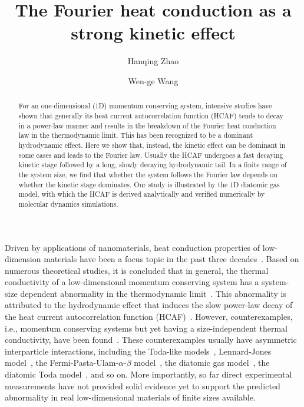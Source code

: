 \documentclass[twocolumn,secnumarabic,amssymb, nobibnotes, aps, pre,superscriptaddress]{revtex4}
\begin{document}


\title{The Fourier heat conduction as a strong kinetic effect}


\author{Hanqing Zhao}
\author{Wen-ge Wang}

\begin{abstract}
For an one-dimensional (1D) momentum conserving system, intensive studies have shown that generally its heat current autocorrelation function (HCAF) tends to decay in a power-law manner and results in the breakdown of the Fourier heat conduction law in the thermodynamic limit. This has been recognized to be a dominant hydrodynamic effect. Here we show that, instead, the kinetic effect can be dominant in some cases and leads to the Fourier law. Usually the HCAF undergoes a fast decaying kinetic stage followed by a long, slowly decaying hydrodynamic tail. In a finite range of the system size, we find that whether the system follows the Fourier law depends on whether the kinetic stage dominates. Our study is illustrated by the 1D diatomic gas model, with which the HCAF is derived analytically and verified numerically by molecular dynamics simulations.
\end{abstract}
\maketitle

Driven by applications of nanomaterials, heat conduction properties of low-dimension materials have been a focus topic in the past three decades~\cite{graphene, nanotube, lepri, dhar, linianbei, lebow, wang}. Based on numerous theoretical studies, it is concluded that in general, the thermal conductivity of a low-dimensional momentum conserving system has a system-size dependent abnormality in the thermodynamic limit~\cite{spohn,beijeren,chen1}.  This abnormality is attributed to the hydrodynamic effect that induces the slow power-law decay of the heat current autocorrelation function (HCAF)~\cite{beijeren, spohn}. However, counterexamples, i.e., momentum conserving systems but yet having a size-independent thermal conductivity, have been found~\cite{chen1, chen2, zhong, savin}. These counterexamples usually have asymmetric interparticle interactions, including the Toda-like models~\cite{zhong}, Lennard-Jones model~\cite{chen2, savin, chen1}, the Fermi-Pasta-Ulam-$\alpha$-$\beta$ model~\cite{saito}, the diatomic gas model~\cite{chendiatom, chendiatom2}, the diatomic Toda model~\cite{chendiatom2}, and so on. More importantly, so far direct experimental measurements have not provided solid evidence yet to support the predicted abnormality in real low-dimensional materials of finite sizes available.
\end{document}
